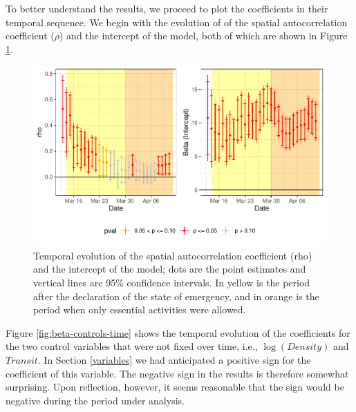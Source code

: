 \documentclass[]{elsarticle} %
\makeatletter
\def\maxwidth{\ifdim\Gin@nat@width>\linewidth\linewidth
\else\Gin@nat@width\fi}
\let\Oldincludegraphics\includegraphics
\renewcommand{\includegraphics}[1]{\Oldincludegraphics[width=\maxwidth]{#1}}
\makeatother
\begin{document}
To better understand the results, we proceed to plot the coefficients in
their temporal sequence. We begin with the evolution of of the spatial
autocorrelation coefficient (\(\rho\)) and the intercept of the model,
both of which are shown in Figure \ref{fig:results-time-1}.

\begin{figure}
\centering
\includegraphics{Environmental-Correlates-of-COVID19-Spain_files/figure-latex/results-time-1-1.pdf}
\caption{\label{fig:results-time-1}Temporal evolution of the spatial
autocorrelation coefficient (rho) and the intercept of the model; dots
are the point estimates and vertical lines are 95\% confidence
intervals. In yellow is the period after the declaration of the state of
emergency, and in orange is the period when only essential activities
were allowed.}
\end{figure}

Figure \ref{fig:beta-controls-time} shows the temporal evolution of the
coefficients for the two control variables that were not fixed over
time, i.e., \(\log(Density)\) and \(Transit\). In Section
\ref{variables} we had anticipated a positive sign for the coefficient
of this variable. The negative sign in the results is therefore somewhat
surprising. Upon reflection, however, it seems reasonable that the sign
would be negative during the period under analysis.
\end{document}
